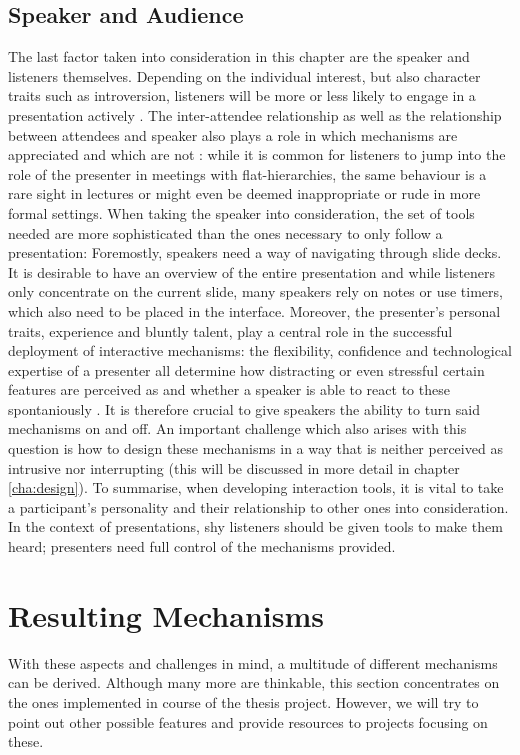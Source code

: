 \subsection{Speaker and Audience}
The last factor taken into consideration in this chapter are the speaker and listeners themselves. Depending on the individual interest, but also character traits such as introversion, listeners will be more or less likely to engage in a presentation actively \cite{Bry:Backstage}. The inter-attendee relationship as well as the relationship between attendees and speaker also plays a role in which mechanisms are appreciated and which are not \cite{Moore:ThreeTypesOfInteraction}: while it is common for listeners to jump into the role of the presenter in meetings with flat-hierarchies, the same behaviour is a rare sight in lectures or might even be deemed inappropriate or rude in more formal settings. When taking the speaker into consideration, the set of tools needed are more sophisticated than the ones necessary to only follow a presentation: Foremostly, speakers need a way of navigating through slide decks. It is desirable to have an overview of the entire presentation and while listeners only concentrate on the current slide, many speakers rely on notes or use timers, which also need to be placed in the interface.
Moreover, the presenter's personal traits, experience and bluntly talent, play a central role in the successful deployment of interactive mechanisms: the flexibility, confidence and technological expertise of a presenter all determine how distracting or even stressful certain features are perceived as and whether a speaker is able to react to these spontaniously \cite{Wacker:PresenterExperience}. It is therefore crucial to give speakers the ability to turn said mechanisms on and off. An important challenge which also arises with this question is how to design these mechanisms in a way that is neither perceived as intrusive nor interrupting (this will be discussed in more detail in chapter \ref{cha:design}).
To summarise, when developing interaction tools, it is vital to take a participant's personality and their relationship to other ones into consideration. In the context of presentations, shy listeners should be given tools to make them heard; presenters need full control of the mechanisms provided.

\section{Resulting Mechanisms}
With these aspects and challenges in mind, a multitude of different mechanisms can be derived. Although many more are thinkable, this section concentrates on the ones implemented in course of the thesis project. However, we will try to point out other possible features and provide resources to projects focusing on these.

